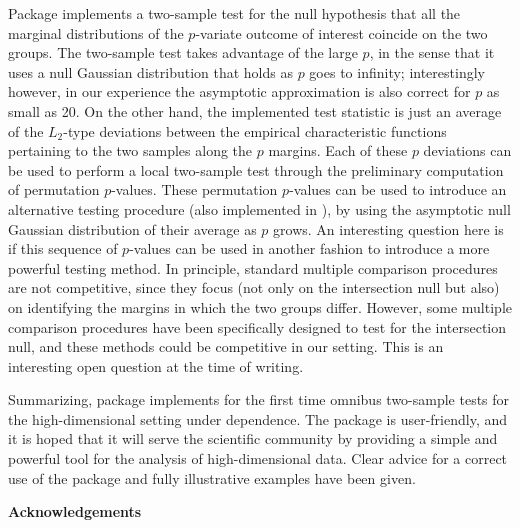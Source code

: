 {
	Package  implements a two-sample test for the null hypothesis that all the marginal distributions of the $p$-variate outcome of interest coincide on the two groups. The two-sample test takes advantage of the large $p$, in the sense that it uses a null Gaussian distribution that holds as $p$ goes to infinity; interestingly however, in our experience the asymptotic approximation is also correct for $p$ as small as 20. On the other hand, the implemented test statistic is just an average of the $L_2$-type deviations between the empirical characteristic functions pertaining to the two samples along the $p$ margins. Each of these $p$ deviations can be used to perform a local two-sample test through the preliminary computation of permutation $p$-values. These permutation $p$-values can be used to introduce an alternative testing procedure (also implemented in ), by using the asymptotic null Gaussian distribution of their average as $p$ grows. An interesting question here is if this sequence of $p$-values can be used in another fashion to introduce a more powerful testing method. In principle, standard multiple comparison procedures are not competitive, since they focus (not only on the intersection null but also) on identifying the margins in which the two groups differ. However, some multiple comparison procedures have been specifically designed to test for the intersection null, and these methods could be competitive in our setting. This is an interesting open question at the time of writing.
	
	
	
	Summarizing,  package implements for the first time omnibus two-sample tests for the high-dimensional setting under dependence. The package is user-friendly, and it is hoped that it will serve the
	scientific community by providing a simple and powerful tool for the analysis of high-dimensional data. Clear advice for a correct use of the package and fully
	illustrative examples have been given.}




\vspace*{0.5cm}


{\bf \large Acknowledgements}

\vspace*{0.25cm}

